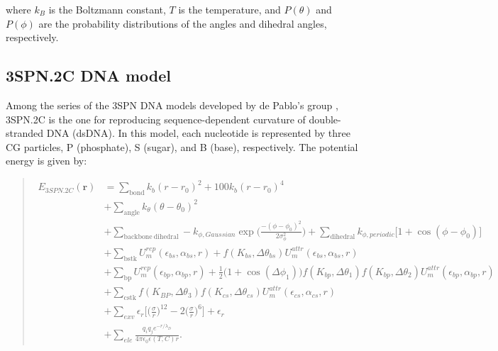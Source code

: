 \documentclass[a4paper,11pt,oneside,english]{sphinxmanual}
\begin{document}
where \(k_B\) is the Boltzmann constant, \(T\) is the temperature,
and \(P(\theta)\) and \(P(\phi)\) are the probability distributions of
the angles and dihedral angles, respectively.


\subsection{3SPN.2C DNA model}
\label{\detokenize{05_Energy:spn-2c-dna-model}}
Among the series of the 3SPN DNA models developed by de Pablo’s group
, 3SPN.2C is the
one for reproducing sequence-dependent curvature of double-stranded DNA
(dsDNA).  In this model, each nucleotide is represented by
three CG particles, P (phosphate), S (sugar), and B (base), respectively.  The
potential energy is given by:
\begin{quote}

\vspace{-5mm}
\begin{equation*}
\begin{split}E_{3SPN.2C}(\mathbf{r}) & = \sum_{\mathrm{bond}} k_b (r - r_{0})^2 + 100 k_b (r - r_{0})^4 \\
    & + \sum_{\mathrm{angle}} k_\theta (\theta - \theta_{0})^2 \\
    & + \sum_{\mathrm{backbone\ dihedral}} -k_{\phi, Gaussian} \exp\big( \frac{-(\phi - \phi_0)^2}{2\sigma_{\phi}^2} \big) + \sum_{\mathrm{dihedral}} k_{\phi, periodic} \big[ 1+\cos(\phi - \phi_0) \big] \\
    & + \sum_{\mathrm{bstk}} U_m^{rep}(\epsilon_{bs}, \alpha_{bs}, r) + f(K_{bs}, \Delta\theta_{bs}) U_m^{attr} (\epsilon_{bs}, \alpha_{bs}, r) \\
    & + \sum_{\mathrm{bp}} U_m^{rep}(\epsilon_{bp}, \alpha_{bp}, r) + \frac{1}{2} \big( 1+\cos(\Delta \phi_1) \big) f(K_{bp}, \Delta\theta_{1}) f(K_{bp}, \Delta\theta_{2}) U_m^{attr} (\epsilon_{bp}, \alpha_{bp}, r) \\
    & + \sum_{\mathrm{cstk}} f(K_{BP}, \Delta\theta_{3}) f(K_{cs}, \Delta\theta_{cs}) U_m^{attr} (\epsilon_{cs}, \alpha_{cs}, r) \\
    & + \sum_{exv} \epsilon_r\bigg[ \Big(\frac{\sigma}{r} \Big)^{12} - 2 \Big(\frac{\sigma}{r} \Big)^6 \bigg]+ \epsilon_r \\
    & + \sum_{ele} \frac{q_i q_j e^{-r/\lambda_D}}{4\pi \epsilon_0 \epsilon(T, C) r}.\end{split}
\end{equation*}
\vspace{-3mm}
\end{quote}
\end{document}
